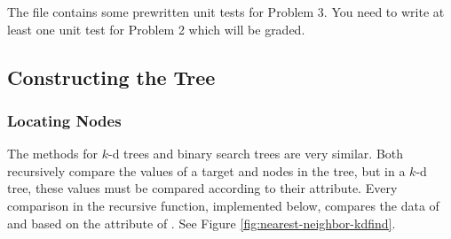 \begin{unittest}
The file  contains some prewritten unit tests for Problem 3. You need to write at least one unit test for Problem 2 which will be graded.
\end{unittest}

\pagebreak


\subsection*{Constructing the Tree} %

\subsubsection*{Locating Nodes} %

The  methods for $k$-d trees and binary search trees are very similar.
Both recursively compare the values of a target and nodes in the tree, but in a $k$-d tree, these values must be compared according to their  attribute.
Every comparison in the recursive  function, implemented below, compares the data of  and  based on the  attribute of .
See Figure \ref{fig:nearest-neighbor-kdfind}.

